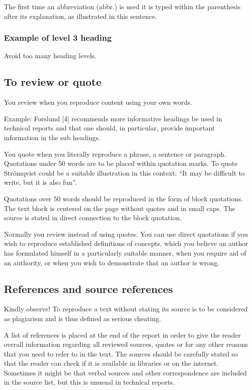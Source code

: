 The first time an abbreviation (abbr.) is used it is typed within the parenthesis after its explanation, as illustrated in this sentence.

\subsubsection{Example of level 3 heading}
\label{ch:theory:level3-heading}
Avoid too many heading levels.

\subsection{To review or quote}
\label{ch:theory:review:quote}
You review when you reproduce content using your own words.

Example: Forslund [4] recommends more informative headings be used in technical reports and that one should, in particular, provide important information in the sub headings.

You quote when you literally reproduce a phrase, a sentence or paragraph. Quotations under 50 words are to be placed within quotation marks. To quote Strömqvist could be a suitable illustration in this context: “It may be difficult to write, but it is also fun”.

Quotations over 50 words should be reproduced in the form of block quotations. The text block is centered on the page without quotes and in small caps. The source is stated in direct connection to the block quotation.

Normally you review instead of using quotes. You can use direct quotations if you wish to reproduce established definitions of concepts, which you believe an author has formulated himself in a particularly suitable manner, when you require aid of an authority, or when you wish to demonstrate that an author is wrong.

\subsection{References and source references}
Kindly observe! To reproduce a text without stating its source is to be considered as plagiarism and is thus defined as serious cheating.

A list of references is placed at the end of the report in order to give the reader overall information regarding all reviewed sources, quotes or for any other reasons that you need to refer to in the text. The sources should be carefully stated so that the reader can check if it is available in libraries or on the internet. Sometimes it might be that verbal sources and other correspondence are included in the source list, but this is unusual in technical reports.

